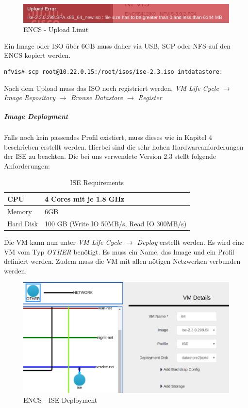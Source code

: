 \begin{figure}[H]
	\centering
	\includegraphics[width=0.8\linewidth]{img/Absicherung/ENCS-Upload-Limit.png}
	\caption{ENCS - Upload Limit}
	\label{fig:ENCS - Upload Limit}
\end{figure}

Ein Image oder ISO über 6GB muss daher via USB, SCP oder NFS auf den ENCS kopiert werden. 

\begin{lstlisting}[language=bash]
nfvis# scp root@10.22.0.15:/root/isos/ise-2.3.iso intdatastore:
\end{lstlisting}

Nach dem Upload muss das ISO noch registriert werden. \textit{VM Life Cycle $\rightarrow$ Image Repository $\rightarrow$ Browse Datastore $\rightarrow$ Register}

\subparagraph{Image Deployment}

Falls noch kein passendes Profil existiert, muss dieses wie in Kapitel 4 beschrieben erstellt werden. Hierbei sind die sehr hohen Hardwareanforderungen der ISE zu beachten. Die bei uns verwendete Version 2.3 stellt folgende Anforderungen:

\begin{table}[H]
	\centering
	\begin{tabularx}{\textwidth}{l | X}
		CPU & 4 Cores mit je 1.8 GHz        \\
		\hline
		Memory & 6GB \\
		\hline
		Hard Disk & 100 GB (Write IO 50MB/s, Read IO 300MB/s) \\
	\end{tabularx}
	\caption{ISE Requirements}
	\label{tab:ISE Requirements}
\end{table}

Die VM kann nun unter \textit{VM Life Cycle $\rightarrow$ Deploy} erstellt werden. Es wird eine VM vom Typ \textit{OTHER} benötigt. Es muss ein Name, das Image und ein Profil definiert werden. Zudem muss die VM mit allen nötigen Netzwerken verbunden werden.

\begin{figure}[H]
	\centering
	\includegraphics[width=0.8\linewidth]{img/Absicherung/ENCS-ISE-Deployment.png}
	\caption{ENCS - ISE Deployment}
	\label{fig:ENCS - ISE Deployment}
\end{figure}

